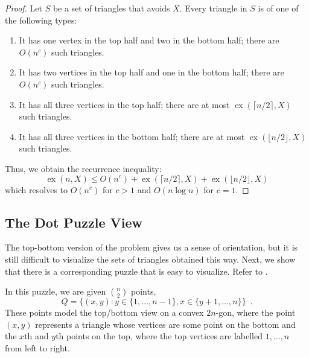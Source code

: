 \documentclass{patmorin}
\DeclareMathOperator{\ex}{ex}
\begin{document}
\begin{proof}
   Let $S$ be a set of triangles that avoids $X$.  Every triangle in $S$
   is of one of the following types:
   \begin{enumerate}
      \item It has one vertex in the top half and two in the bottom half;
        there are $O(n^{c})$ such triangles.
      \item It has two vertices in the top half and one in the bottom
        half; there are $O(n^{c})$ such triangles.
      \item It has all three vertices in the top half; there are at most
        $\ex(\lceil n/2\rceil,X)$ such triangles.
      \item It has all three vertices in the bottom half; there are at
        most $\ex(\lfloor n/2\rfloor,X)$ such triangles.
   \end{enumerate}
   Thus, we obtain the recurrence inequality:
   \[  \ex(n,X) \le O(n^{c}) + \ex(\lceil n/2\rceil,X) + \ex(\lfloor n/2\rfloor,X) \]
   which resolves to $O(n^c)$ for $c>1$ and $O(n\log n)$ for $c=1$.
\end{proof}


\subsection{The Dot Puzzle View}

The top-bottom version of the problem gives us a sense of orientation,
but it is still difficult to visualize the sets of triangles obtained
this way. Next, we show that there is a corresponding puzzle that is
easy to visualize.  Refer to .  

In this puzzle, we are given $\binom{n}{2}$ points,
\[
    Q = \{(x,y): y\in\{1,\ldots,n-1\}, x\in\{y+1,\ldots,n\} \} \enspace .
\]
These points model the top/bottom view on a convex $2n$-gon, where the
point $(x,y)$ represents a triangle whose vertices are some point on
the bottom and the $x$th and $y$th points on the top, where the top
vertices are labelled $1,\ldots,n$ from left to right.
\end{document}
